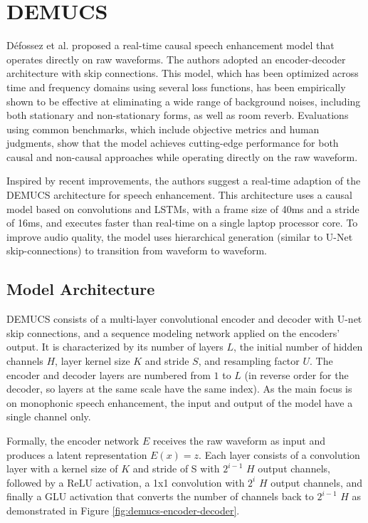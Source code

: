 \section{DEMUCS}
D{\'{e}}fossez et al. \cite{defossez2020} proposed a real-time causal speech enhancement model that operates directly on raw waveforms. The authors adopted an encoder-decoder architecture with skip connections. This model, which has been optimized across time and frequency domains using several loss functions, has been empirically shown to be effective at eliminating a wide range of background noises, including both stationary and non-stationary forms, as well as room reverb. Evaluations using common benchmarks, which include objective metrics and human judgments, show that the model achieves cutting-edge performance for both causal and non-causal approaches while operating directly on the raw waveform.

Inspired by recent improvements, the authors suggest a real-time adaption of the DEMUCS \cite{demucs} architecture for speech enhancement. This architecture uses a causal model based on convolutions and LSTMs, with a frame size of 40ms and a stride of 16ms, and executes faster than real-time on a single laptop processor core. To improve audio quality, the model uses hierarchical generation (similar to U-Net\cite{ronneberger2015u-net} skip-connections) to transition from waveform to waveform.

\subsection{Model Architecture}
DEMUCS consists of a multi-layer convolutional encoder and decoder with U-net \cite{ronneberger2015u-net} skip connections, and a sequence modeling network applied on the encoders' output. It is characterized by its number of layers $L$, the initial number of hidden channels $H$, layer kernel size $K$ and stride $S$, and resampling factor $U$. The encoder and decoder layers are numbered from $1$ to $L$ (in reverse order for the decoder, so layers at the same scale have the same index). As the main focus is on monophonic speech enhancement, the input and output of the model have a single channel only.

Formally, the encoder network $E$ receives the raw waveform as input and produces a latent representation $E(x) = z$. Each layer consists of a convolution layer with a kernel size of $K$ and stride of S with $2^{i-1}$ $H$ output channels, followed by a ReLU activation, a 1x1 convolution with $2^i$ $H$ output channels, and finally a GLU activation that converts the number of channels back to $2^{i-1}$ $H$ as demonstrated in Figure \ref{fig:demucs-encoder-decoder}.


